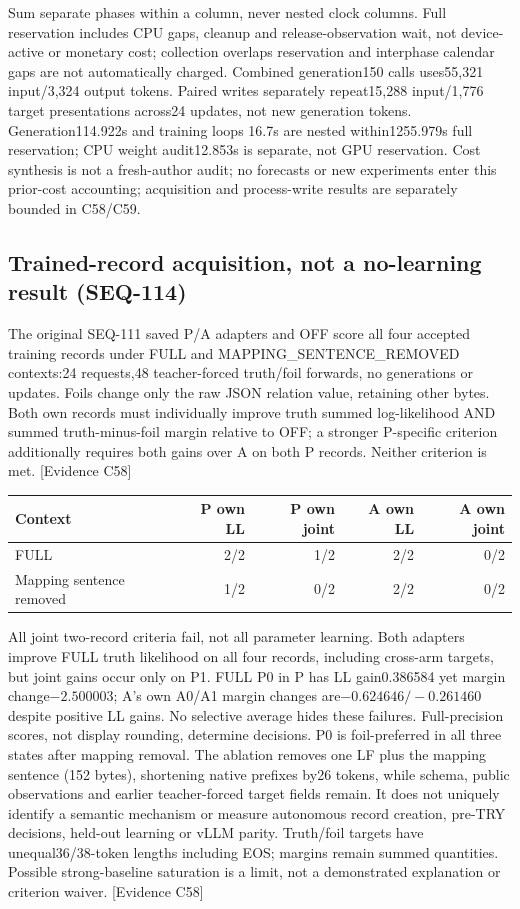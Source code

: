 \documentclass[11pt]{article}
\newcommand{\ev}[1]{\textsf{[Evidence #1]}}
\begin{document}
Sum separate phases within a column, never nested clock columns. Full reservation
includes CPU gaps, cleanup and release-observation wait, not device-active or
monetary cost; collection overlaps reservation and interphase calendar gaps are
not automatically charged. Combined generation150 calls uses55,321 input/3,324
output tokens. Paired writes separately repeat15,288 input/1,776 target presentations
across24 updates, not new generation tokens. Generation114.922s and training loops
16.7s are nested within1255.979s full reservation; CPU weight audit12.853s is
separate, not GPU reservation. Cost synthesis is not a fresh-author audit; no
forecasts or new experiments enter this prior-cost accounting; acquisition and
process-write results are separately bounded in C58/C59.

\subsection{Trained-record acquisition, not a no-learning result (SEQ-114)}
The original SEQ-111 saved P/A adapters and OFF score all four accepted training
records under FULL and MAPPING\_SENTENCE\_REMOVED contexts:24 requests,48
teacher-forced truth/foil forwards, no generations or updates. Foils change only
the raw JSON relation value, retaining other bytes. Both own records must
individually improve truth summed log-likelihood AND summed truth-minus-foil
margin relative to OFF; a stronger P-specific criterion additionally requires
both gains over A on both P records. Neither criterion is met. \ev{C58}

\begin{center}
\begin{tabular}{lrrrr}
\toprule
Context & P own LL & P own joint & A own LL & A own joint \\
\midrule
FULL & 2/2 & 1/2 & 2/2 & 0/2 \\
Mapping sentence removed & 1/2 & 0/2 & 2/2 & 0/2 \\
\bottomrule
\end{tabular}
\end{center}

All joint two-record criteria fail, not all parameter learning. Both adapters
improve FULL truth likelihood on all four records, including cross-arm targets,
but joint gains occur only on P1. FULL P0 in P has LL gain0.386584 yet margin
change$-2.500003$; A's own A0/A1 margin changes are$-0.624646/-0.261460$ despite
positive LL gains. No selective average hides these failures. Full-precision
scores, not display rounding, determine decisions. P0 is foil-preferred in all
three states after mapping removal. The ablation removes one LF plus the mapping
sentence (152 bytes), shortening native prefixes by26 tokens, while schema,
public observations and earlier teacher-forced target fields remain. It does
not uniquely identify a semantic mechanism or measure autonomous record creation,
pre-TRY decisions, held-out learning or vLLM parity. Truth/foil targets have
unequal36/38-token lengths including EOS; margins remain summed quantities.
Possible strong-baseline saturation is a limit, not a demonstrated explanation
or criterion waiver. \ev{C58}
\end{document}
